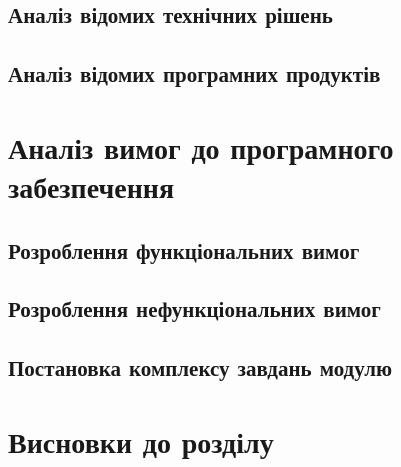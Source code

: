 \subsection{Аналіз відомих технічних рішень}
\subsection{Аналіз відомих програмних продуктів}

\section{Аналіз вимог до програмного забезпечення}
\subsection{Розроблення функціональних вимог}
\subsection{Розроблення нефункціональних вимог}
\subsection{Постановка комплексу завдань модулю}

\section{Висновки до розділу}







